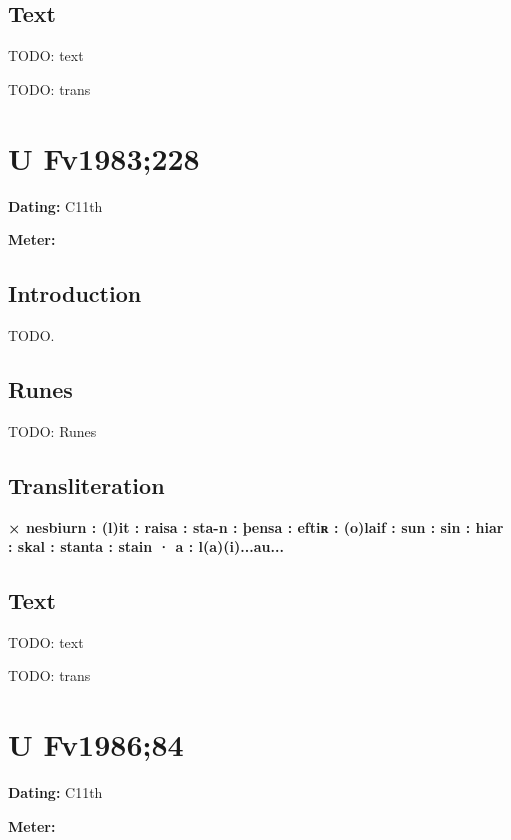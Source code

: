 \subsection{Text}

\bpg\bpa[0]%
TODO: text\epa

\bpb TODO: trans\epb\epg

\sectionline\clearpage


\section{U Fv1983;228}

\begin{flushright}%
\textbf{Dating:} C11th

\textbf{Meter:} \Fornyrdislag
\end{flushright}%

\subsection{Introduction}

TODO.

\subsection{Runes}

TODO: Runes%

\subsection{Transliteration}

\textbf{× nesbiurn : (l)it : raisa : sta-n : þensa : eftiʀ : (o)laif : sun : sin : hiar : skal : stanta : stain · a : l(a)(i)...au...}

\subsection{Text}

\bpg\bpa[0]%
TODO: text\epa

\bpb TODO: trans\epb\epg

\sectionline\clearpage


\section{U Fv1986;84}

\begin{flushright}%
\textbf{Dating:} C11th

\textbf{Meter:} \Fornyrdislag
\end{flushright}%


